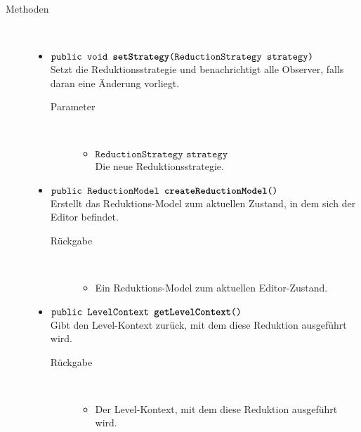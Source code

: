 \begin{description}
\item[Methoden] \hfill \\
	\vspace{-.8cm}
	\begin{itemize}
		\item $\texttt{public void \textbf{setStrategy}(ReductionStrategy strategy)}$ \\ Setzt die Reduktionsstrategie und benachrichtigt alle Observer, falls daran eine Änderung vorliegt.
		\begin{description}
			\item[Parameter] \hfill \\
			\vspace{-.8cm}
			\begin{itemize}
				\item $\texttt{ReductionStrategy strategy}$ \\ Die neue Reduktionsstrategie.
			\end{itemize}
		\end{description}
		
		\item $\texttt{public ReductionModel \textbf{createReductionModel}()}$ \\ Erstellt das Reduktions-Model zum aktuellen Zustand, in dem sich der Editor befindet.
		\begin{description}
			\item[Rückgabe] \hfill \\
			\vspace{-.8cm}
			\begin{itemize}
				\item Ein Reduktions-Model zum aktuellen Editor-Zustand.
			\end{itemize}
		\end{description}
	
		\item $\texttt{public LevelContext \textbf{getLevelContext}()}$ \\ Gibt den Level-Kontext zurück, mit dem diese Reduktion ausgeführt wird.
		\begin{description}
			\item[Rückgabe] \hfill \\
			\vspace{-.8cm}
			\begin{itemize}
				\item Der Level-Kontext, mit dem diese Reduktion ausgeführt wird.
			\end{itemize}
		\end{description}
	\end{itemize}
\end{description}

